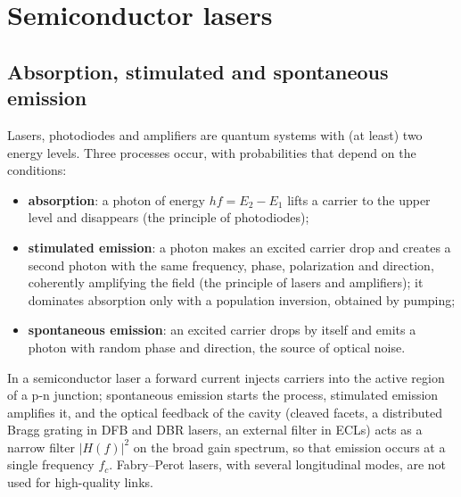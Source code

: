 \section{Semiconductor lasers}\label{sec:lasers}
\subsection{Absorption, stimulated and spontaneous emission}
Lasers, photodiodes and amplifiers are quantum systems with (at least) two energy levels.
Three processes occur, with probabilities that depend on the conditions:
\begin{itemize}
  \item \textbf{absorption}: a photon of energy $hf=E_2-E_1$ lifts a carrier to the upper
  level and disappears (the principle of photodiodes);
  \item \textbf{stimulated emission}: a photon makes an excited carrier drop and creates a second
  photon with the same frequency, phase, polarization and direction, coherently amplifying the
  field (the principle of lasers and amplifiers); it dominates absorption only with a population
  inversion, obtained by pumping;
  \item \textbf{spontaneous emission}: an excited carrier drops by itself and emits a photon with
  random phase and direction, the source of optical noise.
\end{itemize}
In a semiconductor laser a forward current injects carriers into the active region of a p-n
junction; spontaneous emission starts the process, stimulated emission amplifies it, and the
optical feedback of the cavity (cleaved facets, a distributed Bragg grating in DFB and DBR lasers,
an external filter in ECLs) acts as a narrow filter $|H(f)|^2$ on the broad gain spectrum, so that
emission occurs at a single frequency $f_c$. Fabry--Perot lasers, with several longitudinal modes,
are not used for high-quality links.

